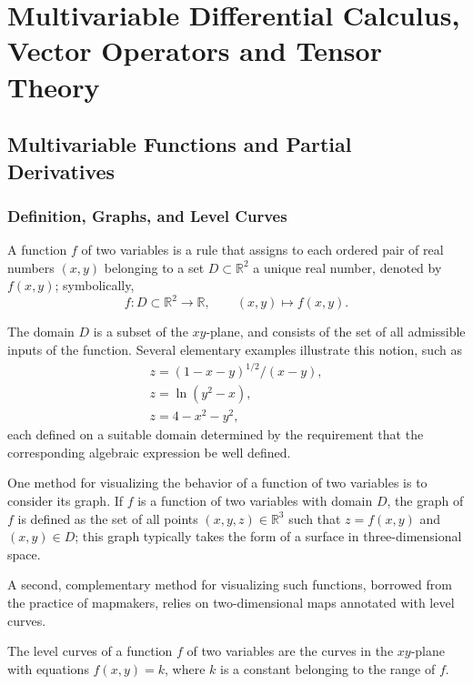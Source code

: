 \chapter[Multivariable Calculus, Vector Operators, and Tensors]{Multivariable Differential Calculus, Vector Operators and Tensor Theory}

\section{Multivariable Functions and Partial Derivatives}

\subsection{Definition, Graphs, and Level Curves}

A function $f$ of two variables is a rule that assigns to each ordered pair of real numbers $(x,y)$ belonging to a set $D \subset \mathbb{R}^2$ a unique real number, denoted by $f(x,y)$; symbolically,
\[
f : D \subset \mathbb{R}^2 \to \mathbb{R}, \qquad (x,y) \mapsto f(x,y).
\]

The domain $D$ is a subset of the $xy$-plane, and consists of the set of all admissible inputs of the function. Several elementary examples illustrate this notion, such as
\[
\begin{gathered}
z = (1-x-y)^{1/2}/(x-y), \\[0.5em]
z = \ln(y^2-x), \\[0.5em]
z = 4 - x^2 - y^2,
\end{gathered}
\]
each defined on a suitable domain determined by the requirement that the corresponding algebraic expression be well defined.

One method for visualizing the behavior of a function of two variables is to consider its graph. If $f$ is a function of two variables with domain $D$, the graph of $f$ is defined as the set of all points $(x,y,z) \in \mathbb{R}^3$ such that $z = f(x,y)$ and $(x,y) \in D$; this graph typically takes the form of a surface in three-dimensional space.

A second, complementary method for visualizing such functions, borrowed from the practice of mapmakers, relies on two-dimensional maps annotated with level curves.

\begin{definition}
The level curves of a function $f$ of two variables are the curves in the $xy$-plane with equations $f(x,y) = k$, where $k$ is a constant belonging to the range of $f$.
\end{definition}

